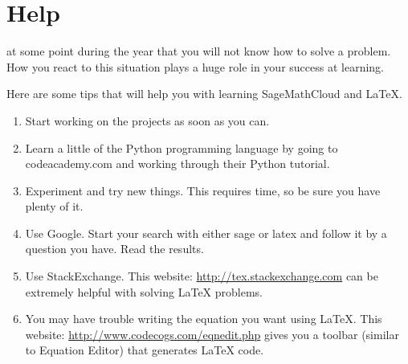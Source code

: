 \documentclass
[justified,nohyper]
{tufte-handout}
\begin{document}
\section{Help}

 at some point during the year that you will not know how to solve a problem. How you react to this situation plays a huge role in your success at learning.

Here are some tips that will help you with learning SageMathCloud and \LaTeX.

\begin{enumerate}
  \item Start working on the projects as soon as you can.
  \item Learn a little of the Python programming language by going to codeacademy.com and working through their Python tutorial.
  \item Experiment and try new things. This requires time, so be sure you have plenty of it.
  \item Use Google. Start your search with either sage or latex and follow it by a question you have. Read the results.
  \item Use StackExchange. This website: \url{http://tex.stackexchange.com} can be extremely helpful with solving \LaTeX\; problems.
  \item You may have trouble writing the equation you want using \LaTeX\;. This website: \url{http://www.codecogs.com/eqnedit.php} gives you a toolbar (similar to Equation Editor) that generates \LaTeX\; code.
\end{enumerate}
\end{document}
